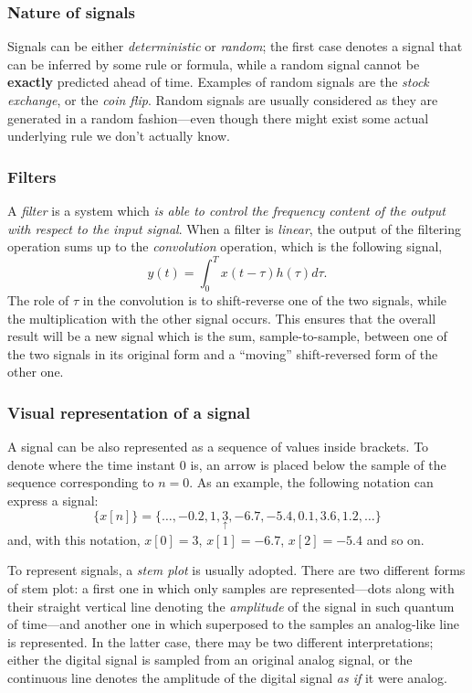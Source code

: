 \documentclass[\documentfontsize, twocolumn]{\classname}
\begin{document}
\subsubsection{Nature of signals}

Signals can be either \emph{deterministic} or \emph{random}; the first case denotes a signal that can be inferred by some rule or formula, while a random signal cannot be \textbf{exactly} predicted ahead of time.
Examples of random signals are the \emph{stock exchange}, or the \emph{coin flip}.
Random signals are usually considered as they are generated in a random fashion---even though there might exist some actual underlying rule we don't actually know.

\subsubsection{Filters}

A \emph{filter} is a system which \emph{is able to control the frequency
content of the output with respect to the input signal}. When a filter is
\emph{linear}, the output of the filtering operation sums up to the
\emph{convolution} operation, which is the following signal,
\[
y(t) = \int_0^T x(t - \tau)h(\tau)d\tau.
\]
The role of $\tau$ in the convolution is to shift-reverse one of the two
signals, while the multiplication with the other signal occurs. This ensures
that the overall result will be a new signal which is the sum,
sample-to-sample, between one of the two signals in its original form and a
``moving'' shift-reversed form of the other one.

\subsubsection{Visual representation of a signal}

A signal can be also represented as a se\-quen\-ce of values inside brackets. To
denote where the time instant $0$ is, an arrow is placed below the sample of the
se\-quen\-ce corresponding to $n=0$. As an example, the following notation can express a signal:
\[ \{x[n]\} = \{\dots, -0.2,1,\underset{\uparrow}{3},-6.7,-5.4,0.1,3.6,1.2,\dots\}\] and, with this notation, $x[0]=3$, $x[1] = -6.7$, $x[2] = -5.4$ and so on.

To represent signals, a \emph{stem plot} is usually adopted. There are two
different forms of stem plot: a first one in which only samples are
represented---dots along with their straight vertical line denoting the
\emph{amplitude} of the signal in such quantum of time---and another one in
which superposed to the samples an analog-like line is represented. In the
latter case, there may be two different interpretations; either the digital
signal is sampled from an original analog signal, or the continuous line
denotes the amplitude of the digital signal \emph{as if} it were analog.
\end{document}
